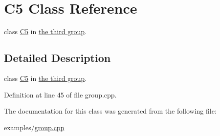 \hypertarget{class_c5}{}\section{C5 Class Reference}
\label{class_c5}


class \hyperlink{class_c5}{C5} in \hyperlink{group__group3}{the third group}.  




\subsection{Detailed Description}
class \hyperlink{class_c5}{C5} in \hyperlink{group__group3}{the third group}. 

Definition at line 45 of file group.\+cpp.



The documentation for this class was generated from the following file\+:\begin{DoxyCompactItemize}
\item 
examples/\hyperlink{group_8cpp}{group.\+cpp}\end{DoxyCompactItemize}
